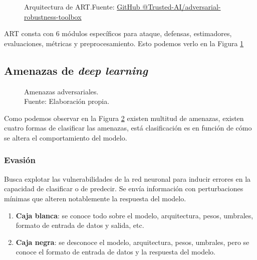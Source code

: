 \begin{figure}[H]
    \centering
    \centerline{}
    \caption{Arquitectura de ART.\newline{}Fuente: \href{https://github.com/Trusted-AI/adversarial-robustness-toolbox/wiki/ART-Architecture-and-Roadmap}{GitHub @Trusted-AI/adversarial-robustness-toolbox}}
    \label{fig:art-architecture}
\end{figure}

ART \cite{art2018} consta con 6 módulos específicos para ataque, defensas, estimadores, evaluaciones, métricas y preprocesamiento. Esto podemos verlo en la Figura \ref{fig:art-architecture}

\subsection{Amenazas de \textit{deep learning}}
\begin{figure}[H]
    \centering
    \centerline{}
    \caption{Amenazas adversariales.\\Fuente: Elaboración propia.}
    \label{fig:art-adversarial-threats}
\end{figure}

Como podemos observar en la Figura \ref{fig:art-adversarial-threats} existen multitud de amenazas, existen cuatro formas de clasificar las amenazas, está clasificación es en función de cómo se altera el comportamiento del modelo.

\subsubsection{Evasión}

Busca explotar las vulnerabilidades de la red neuronal para inducir errores en la capacidad de clasificar o de predecir. Se envía información con perturbaciones mínimas que alteren notablemente la respuesta del modelo.

\begin{enumerate}
    \item \textbf{Caja blanca}: se conoce todo sobre el modelo, arquitectura, pesos, umbrales, formato de entrada de datos y salida, etc. \cite{learning-machine-learning-part-3-attacking}
    \item \textbf{Caja negra}: se desconoce el modelo, arquitectura, pesos, umbrales, pero se conoce el formato de entrada de datos y la respuesta del modelo. \cite{learning-machine-learning-part-3-attacking}
\end{enumerate}

